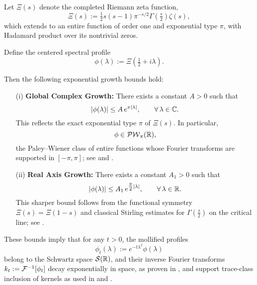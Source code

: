 \begin{lemma}
\label{lem:xi_growth_bound}
Let \( \Xi(s) \) denote the completed Riemann zeta function,
\[
\Xi(s) := \tfrac{1}{2} s(s-1) \pi^{-s/2} \Gamma\left(\tfrac{s}{2}\right) \zeta(s),
\]
which extends to an entire function of order one and exponential type \( \pi \), with Hadamard product over its nontrivial zeros.

Define the centered spectral profile
\[
\phi(\lambda) := \Xi\left( \tfrac{1}{2} + i\lambda \right).
\]

Then the following exponential growth bounds hold:
\begin{itemize}
    \item[\textup{(i)}] \textbf{Global Complex Growth:} There exists a constant \( A > 0 \) such that
    \[
    |\phi(\lambda)| \le A\, e^{\pi |\lambda|}, \qquad \forall\, \lambda \in \mathbb{C}.
    \]
    This reflects the exact exponential type \( \pi \) of \( \Xi(s) \). In particular,
    \[
    \phi \in \mathcal{PW}_{\pi}(\mathbb{R}),
    \]
    the Paley--Wiener class of entire functions whose Fourier transforms are supported in \( [-\pi, \pi] \); see  and \cite[Thm.~3.7.1]{Levin1996EntireLectures}.

    \item[\textup{(ii)}] \textbf{Real Axis Growth:} There exists a constant \( A_1 > 0 \) such that
    \[
    |\phi(\lambda)| \le A_1\, e^{\tfrac{\pi}{2} |\lambda|}, \qquad \forall\, \lambda \in \mathbb{R}.
    \]
    This sharper bound follows from the functional symmetry \( \Xi(s) = \Xi(1 - s) \) and classical Stirling estimates for \( \Gamma\left(\tfrac{s}{2}\right) \) on the critical line; see \cite[§4.12]{Titchmarsh1986Zeta}.
\end{itemize}

\medskip
\noindent
These bounds imply that for any \( t > 0 \), the mollified profiles
\[
\phi_t(\lambda) := e^{-t\lambda^2} \phi(\lambda)
\]
belong to the Schwartz space \( \mathcal{S}(\mathbb{R}) \), and their inverse Fourier transforms \( k_t := \mathcal{F}^{-1}[\phi_t] \) decay exponentially in space, as proven in , and support trace-class inclusion of kernels as used in  and .
\end{lemma}
